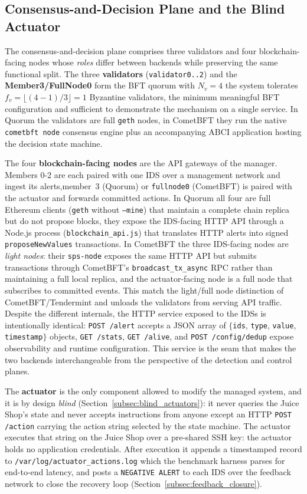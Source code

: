 \subsection{Consensus-and-Decision Plane and the Blind Actuator}
\label{subsec:impl_consensus_plane}

The consensus-and-decision plane comprises three validators and four blockchain-facing nodes whose \emph{roles} differ between backends while preserving the same functional split. The three \textbf{validators} (\texttt{validator0..2}) and the \textbf{Member3/FullNode0} form the BFT quorum with $N_v=4$ the system tolerates $f_v=\lfloor(4-1)/3\rfloor=1$ Byzantine validators, the minimum meaningful BFT configuration and sufficient to demonstrate the mechanism on a single service. In Quorum the validators are full \texttt{geth} nodes, in CometBFT they run the native \texttt{cometbft node} consensus engine plus an accompanying ABCI application hosting the decision state machine.

The four \textbf{blockchain-facing nodes} are the API gateways of the manager. Members 0-2 are each paired with one IDS over a management network and ingest its alerts,member~3 (Quorum) or \texttt{fullnode0} (CometBFT) is paired with the actuator and forwards committed actions. In Quorum all four are full Ethereum clients (\texttt{geth} without \texttt{--mine}) that maintain a complete chain replica but do not propose blocks, they expose the IDS-facing HTTP API through a Node.js process (\texttt{blockchain\_api.js}) that translates HTTP alerts into signed \texttt{proposeNewValues} transactions. In CometBFT the three IDS-facing nodes are \emph{light nodes}: their \texttt{sps-node} exposes the same HTTP API but submits transactions through CometBFT's \texttt{broadcast\_tx\_async} RPC rather than maintaining a full local replica, and the actuator-facing node is a full node that subscribes to committed events. This match the light/full node distinction of CometBFT/Tendermint and unloads the validators from serving API traffic. Despite the different internals, the HTTP service exposed to the IDSs is intentionally identical: \texttt{POST /alert} accepts a JSON array of $\{$\texttt{ids}, \texttt{type}, \texttt{value}, \texttt{timestamp}$\}$ objects, \texttt{GET /stats}, \texttt{GET /alive}, and \texttt{POST /config/dedup} expose observability and runtime configuration. This service is the seam that makes the two backends interchangeable from the perspective of the detection and control planes.

The \textbf{actuator} is the only component allowed to modify the managed system, and it is by design \emph{blind} (Section~\ref{subsec:blind_actuators}): it never queries the Juice Shop's state and never accepts instructions from anyone except an HTTP \texttt{POST /action} carrying the action string selected by the state machine. The actuator executes that string on the Juice Shop over a pre-shared SSH key:
the actuator holds no application credentials. After execution it appends a timestamped record to \texttt{/var/log/actuator\_actions.log} which the benchmark harness parses for end-to-end latency, and posts a \texttt{NEGATIVE ALERT} to each IDS over the feedback network to close the recovery loop (Section~\ref{subsec:feedback_closure}).

